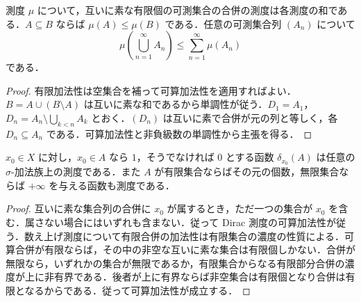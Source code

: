 \begin{prop}[測度の単調性と劣加法性]
測度 $\mu$ について，互いに素な有限個の可測集合の合併の測度は各測度の和である．$A\subseteq B$ ならば $\mu(A)\leq\mu(B)$ である．任意の可測集合列 $(A_n)$ について
\[
 \mu\left(\bigcup_{n=1}^{\infty}A_n\right)\leq\sum_{n=1}^{\infty}\mu(A_n)
\]
である．
\end{prop}
\begin{proof}
有限加法性は空集合を補って可算加法性を適用すればよい．$B=A\cup(B\setminus A)$ は互いに素な和であるから単調性が従う．$D_1=A_1$，$D_n=A_n\setminus\bigcup_{k<n}A_k$ とおく．$(D_n)$ は互いに素で合併が元の列と等しく，各 $D_n\subseteq A_n$ である．可算加法性と非負級数の単調性から主張を得る．
\end{proof}
\begin{example}[Dirac測度と数え上げ測度]
$x_0\in X$ に対し，$x_0\in A$ なら $1$，そうでなければ $0$ とする函数 $\delta_{x_0}(A)$ は任意の $\sigma$-加法族上の測度である．また $A$ が有限集合ならばその元の個数，無限集合ならば $+\infty$ を与える函数も測度である．
\end{example}
\begin{proof}
互いに素な集合列の合併に $x_0$ が属するとき，ただ一つの集合が $x_0$ を含む．属さない場合にはいずれも含まない．従って Dirac 測度の可算加法性が従う．数え上げ測度について有限合併の加法性は有限集合の濃度の性質による．可算合併が有限ならば，その中の非空な互いに素な集合は有限個しかない．合併が無限なら，いずれかの集合が無限であるか，有限集合からなる有限部分合併の濃度が上に非有界である．後者が上に有界ならば非空集合は有限個となり合併は有限となるからである．従って可算加法性が成立する．
\end{proof}
